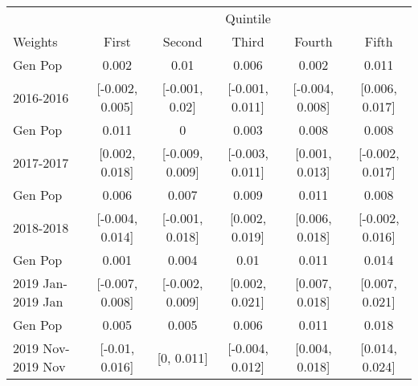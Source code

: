 \begin{tabular}{l|ccccc}
\hline\hline
      & \multicolumn{5}{c}{Quintile} \\
Weights & First & Second & Third & Fourth & Fifth \\
\hline\hline
Gen Pop  &  0.002 & 0.01 & 0.006 & 0.002 & 0.011 \\ 
 2016-2016 & [-0.002, 0.005] & [-0.001, 0.02] & [-0.001, 0.011] & [-0.004, 0.008] & [0.006, 0.017] \\ 
 \hline
Gen Pop  &  0.011 & 0 & 0.003 & 0.008 & 0.008 \\ 
 2017-2017 & [0.002, 0.018] & [-0.009, 0.009] & [-0.003, 0.011] & [0.001, 0.013] & [-0.002, 0.017] \\ 
 \hline
Gen Pop  &  0.006 & 0.007 & 0.009 & 0.011 & 0.008 \\ 
 2018-2018 & [-0.004, 0.014] & [-0.001, 0.018] & [0.002, 0.019] & [0.006, 0.018] & [-0.002, 0.016] \\ 
 \hline
Gen Pop  &  0.001 & 0.004 & 0.01 & 0.011 & 0.014 \\ 
 2019 Jan-2019 Jan & [-0.007, 0.008] & [-0.002, 0.009] & [0.002, 0.021] & [0.007, 0.018] & [0.007, 0.021] \\ 
 \hline
Gen Pop  &  0.005 & 0.005 & 0.006 & 0.011 & 0.018 \\ 
 2019 Nov-2019 Nov & [-0.01, 0.016] & [0, 0.011] & [-0.004, 0.012] & [0.004, 0.018] & [0.014, 0.024] \\ 
 \hline
\hline
\end{tabular}
